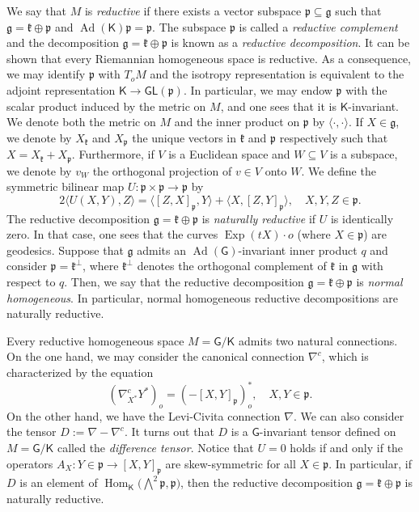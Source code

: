 \documentclass[11pt,a4paper,final]{amsart}
\newcommand{\s}{\mathsf}
\newcommand{\g}{\mathfrak}
\newcommand{\Ad}{\operatorname{Ad}}
\newcommand{\Exp}{\operatorname{Exp}}
\theoremstyle{definition}
\begin{document}
We say that $M$ is \textit{reductive} if there exists a vector subspace $\g{p}\subseteq \g{g}$ such that $\g{g}=\g{k}\oplus \g{p}$ and $\Ad(\mathsf{K})\g{p}=\g{p}$.
The subspace $\g{p}$ is called a \textit{reductive complement} and the decomposition $\g{g}=\g{k}\oplus \g{p}$ is known as a \textit{reductive decomposition}.
It can be shown that every Riemannian homogeneous space is reductive.
As a consequence, we may identify $\g{p}$ with $T_{o}M$ and the isotropy representation is equivalent to the adjoint representation $\mathsf{K}\to \mathsf{GL}(\g{p})$.
In particular, we may endow $\g{p}$ with the scalar product induced by the metric on $M$, and one sees that it is $\mathsf{K}$-invariant.
We denote both the metric on $M$ and the inner product on $\g{p}$ by $\langle\cdot,\cdot\rangle$.
If $X\in \g{g}$, we denote by $X_{\g{k}}$ and $X_{\g{p}}$ the unique vectors in $\g{k}$ and $\g{p}$ respectively such that $X=X_{\g{k}}+X_{\g{p}}$.
Furthermore, if $V$ is a Euclidean space and $W\subseteq V$ is a subspace, we denote by $v_{W}$ the orthogonal projection of $v\in V$ onto $W$. We define the symmetric bilinear map $U\colon\g{p}\times\g{p}\rightarrow \g{p}$ by
\begin{equation}\label{eq:UTensor}
	2 \langle U(X, Y),Z \rangle=\langle [Z,X]_{\g{p}},Y\rangle + \langle X, [Z,Y]_{\g{p}}\rangle, \quad X,Y,Z\in\g{p}.
\end{equation}
The reductive decomposition $\g{g}=\g{k}\oplus\g{p}$ is \textit{naturally reductive} if $U$ is identically zero.
In that case, one sees that the curves $\Exp(tX)\cdot o$ (where $X\in\g{p}$) are geodesics.
Suppose that $\g{g}$ admits an $\Ad(\s{G})$-invariant inner product $q$ and consider $\g{p}=\g{k}^\perp$, where $\g{k}^{\perp}$ denotes the orthogonal complement of $\g{k}$ in $\g{g}$ with respect to $q$.
Then, we say that the reductive decomposition $\g{g}=\g{k}\oplus\g{p}$ is \textit{normal homogeneous}. In particular, normal homogeneous reductive decompositions are naturally reductive.
	
Every reductive homogeneous space $M=\mathsf{G}/\mathsf{K}$ admits two natural connections.
On the one hand, we may consider the canonical connection $\nabla^{c}$, which is characterized by the equation
\[
	(\nabla^{c}_{X^{*}}Y^{*})_{o}=(-[X,Y]_{\g{p}})^{*}_{o}, \quad X,Y\in\g{p}.
\]
On the other hand, we have the Levi-Civita connection $\nabla$. We can also consider the tensor  $D:=\nabla - \nabla^c$. It turns out that $D$ is a $\s{G}$-invariant tensor defined on $M=\s{G}/\s{K}$ called the \textit{difference tensor}. Notice that $U=0$ holds if and only if the operators $A_{X}\colon Y\in \g{p}\to [X,Y]_{\g{p}}$ are skew-symmetric for all $X\in \g{p}$.
In particular, if $D$ is an element of $\operatorname{Hom}_{\s{K}}\bigl(\bigwedge^{2}\g{p},\g{p}\bigr)$, then  the reductive decomposition $\g{g}=\g{k}\oplus\g{p}$ is naturally reductive. 
	
\end{document}
